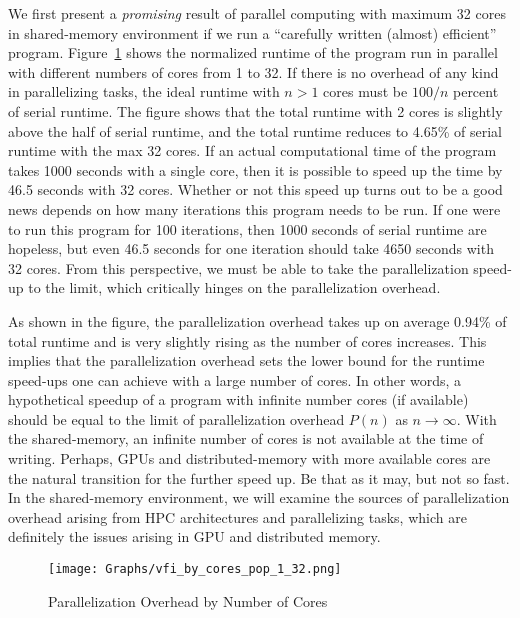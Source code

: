 \documentclass[12pt]{article}
\begin{document}
We first present a \textit{promising} result of parallel computing with maximum 32 cores in shared-memory environment if we run a ``carefully written (almost) efficient'' program. Figure~\ref{fig:runtime_cores_pop_1_32} shows the normalized runtime of the program run in parallel with different numbers of cores from 1 to 32. If there is no overhead of any kind in parallelizing tasks, the ideal runtime with $n>1$ cores must be $100/n$ percent of serial runtime. The figure shows that the total runtime with 2 cores is slightly above the half of serial runtime, and the total runtime reduces to 4.65\% of serial runtime with the max 32 cores. If an actual computational time of the program takes 1000 seconds with a single core, then it is possible to speed up the time by 46.5 seconds with 32 cores. Whether or not this speed up turns out to be a good news depends on how many iterations this program needs to be run. If one were to run this program for 100 iterations, then 1000 seconds of serial runtime are hopeless, but even 46.5 seconds for one iteration should take 4650 seconds with 32 cores. From this perspective, we must be able to take the parallelization speed-up to the limit, which critically hinges on the parallelization overhead.

As shown in the figure, the parallelization overhead takes up on average 0.94\% of total runtime and is very slightly rising as the number of cores increases. This implies that the parallelization overhead sets the lower bound for the runtime speed-ups one can achieve with a large number of cores. In other words, a hypothetical speedup of a program with infinite number cores (if available) should be equal to the limit of parallelization overhead $P(n)$ as $n\rightarrow\infty$. With the shared-memory, an infinite number of cores is not available at the time of writing. Perhaps, GPUs and distributed-memory with more available cores are the natural transition for the further speed up. Be that as it may, but not so fast. In the shared-memory environment, we will examine the sources of parallelization overhead arising from HPC architectures and parallelizing tasks, which are definitely the issues arising in GPU and distributed memory.
\begin{figure}[t!]
\sf
\begin{center}
\caption{\sf Parallelization Overhead by Number of Cores}
\texttt{[image: Graphs/vfi\_by\_cores\_pop\_1\_32.png]}\label{fig:runtime_cores_pop_1_32}
\end{center}
\end{figure}
\end{document}
